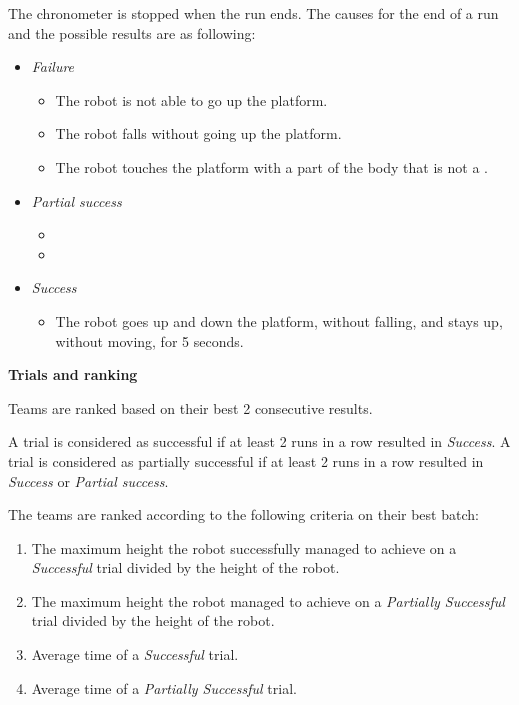 The chronometer is stopped when the run ends. The causes for the end of a run and
the possible results are as following:
\begin{itemize}
\item \textit{Failure}
  \begin{itemize}
    \item The robot is not able to go up the platform.
    \item The robot falls without going up the platform.
        \item The robot touches the platform with a part of the body that is not a .
     \end{itemize}
\item \textit{Partial success}
  \begin{itemize}
    \item {}
     \item {}
  \end{itemize}
\item \textit{Success}
  \begin{itemize}
    \item The robot goes up and down the platform, without falling, and stays up, without moving, for 5 seconds.
  \end{itemize}
\end{itemize}

{\bfseries Trials and ranking}

\smallskip

Teams are ranked based on their best 2 consecutive results.

A trial is considered as successful if at least 2 runs in a row resulted in \textit{Success}. A trial is considered as
partially successful if at least 2 runs in a row resulted in \textit{Success} or \textit{Partial success}.

The teams are ranked according to the following criteria on their best batch:
\begin{enumerate}
\item The maximum height the robot successfully managed to achieve on a \textit{Successful} trial divided by the height of the robot.
\item The maximum height the robot managed to achieve on a \textit{Partially Successful} trial divided by the height of the robot.
\item Average time of a \textit{Successful} trial.
\item Average time of a \textit{Partially Successful} trial.
\end{enumerate}
